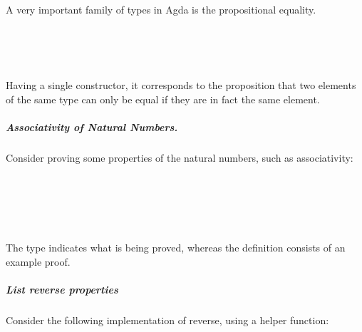\documentclass[12pt,twoside,notitlepage]{report}
\begin{document}
A very important family of types in Agda is the propositional equality. 

\begin{code}
\\
\>  \AgdaSymbol{\{}\AgdaSymbol{\}} \AgdaSymbol{\{} \AgdaSymbol{:}  \AgdaSymbol{\}} \AgdaSymbol{(} \AgdaSymbol{:} \AgdaSymbol{)} \AgdaSymbol{:}     \<%
\\
\>[0]\<[2]%
\>[2] \AgdaSymbol{:}   \<%
\\
\end{code}
Having a single constructor, it corresponds to the proposition that two elements of the same type can only be equal if they are in fact the same element. 

\subparagraph{Associativity of Natural Numbers.}
Consider proving some properties of the natural numbers, such as associativity: \\
\begin{code}
\\
\>[0]\<[2]%
\>[2] \AgdaSymbol{:}  \AgdaSymbol{(}   \AgdaSymbol{:} \AgdaSymbol{)}  \AgdaSymbol{(} \AgdaPrimitive{+} \AgdaSymbol{(} \AgdaPrimitive{+} \AgdaSymbol{))}  \AgdaSymbol{((} \AgdaPrimitive{+} \AgdaSymbol{)} \AgdaPrimitive{+} \AgdaSymbol{)}\<%
\\
\>[0]\<[2]%
\>[2]    \AgdaSymbol{=} \<%
\\
\>[0]\<[2]%
\>[2] \AgdaSymbol{(} \AgdaSymbol{)}        \AgdaSymbol{=} \<%
\\
\end{code}
The type indicates what is being proved, whereas the definition consists of an example proof.

\subparagraph{List reverse properties}
Consider the following implementation of reverse, using a helper function: 
\end{document}
